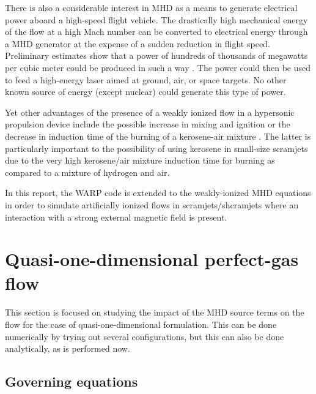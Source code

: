 \documentclass[oneside,10pt,onecolumn]{waflreport}
\begin{document}
There is also
a considerable interest in MHD as a means to generate electrical
power aboard a high-speed flight vehicle. The drastically high mechanical
energy of the flow at a high Mach number can be converted to electrical energy
through a MHD generator at the expense of a sudden reduction in flight speed.
Preliminary estimates show that a power
of hundreds of thousands of megawatts per cubic meter could be produced in such a way
\cite{aiaaconf:2002:thibodeaux}. The power
could then be used to feed a high-energy laser aimed at ground, air, or space targets. No
other known source of energy (except nuclear) could generate this type of power.

Yet other advantages of the presence of a weakly ionized flow in a hypersonic propulsion
device include the possible increase in mixing and ignition \cite{aiaaconf:2002:bocharov}
or the decrease in induction time of the burning
of a kerosene-air mixture \cite{aiaaconf:2002:klimov}. The latter is
particularly important to the possibility of using kerosene in small-size scramjets due
to the very high kerosene/air mixture induction time for burning as compared to a mixture
of hydrogen and air.


In this report, the WARP code \cite{jcp:2002:parent,aiaa:2002:parent}
is extended to the weakly-ionized MHD equations in order to simulate artificially
ionized flows in scramjets/shcramjets where an interaction with a strong external
magnetic field is present.



\section{Quasi-one-dimensional perfect-gas flow}

This section is focused on studying the impact of the MHD source terms on the flow for the case
of quasi-one-dimensional formulation. This can be done numerically by trying out several
configurations, but this can also be done analytically, as is performed now.

\subsection{Governing equations}
\end{document}
